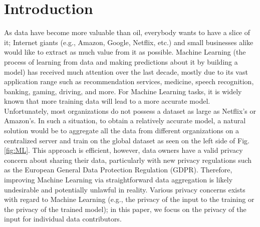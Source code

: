 \documentclass[USenglish,oneside,twocolumn]{article}
\theoremstyle{plain}
\begin{document}
    \vspace{-0.5cm}

	
    \DOI{}
    \received{}
    \revised{}
    \accepted{}

    \journalyear{}
    \journalvolume{}
    \journalissue{}

	\maketitle

    \vspace{-0.5cm}
    \section{Introduction}
    \label{sec:int}
    \vspace{-0.25cm}
    
    As data have become more valuable than oil, everybody wants to have a slice of it; Internet giants (e.g., Amazon, Google, Netflix, etc.) and small businesses alike would like to extract as much value from it as possible. Machine Learning (the process of learning from data and making predictions about it by building a model) has received much attention over the last decade, mostly due to its vast application range such as recommendation services, medicine, speech recognition, banking, gaming, driving, and more. For Machine Learning tasks, it is widely known that more training data will lead to a more accurate model. Unfortunately, most organizations do not possess a dataset as large as Netflix's or Amazon's. In such a situation, to obtain a relatively accurate model, a natural solution would be to aggregate all the data from different organizations on a centralized server and train on the global dataset as seen on the left side of Fig. \ref{fig:ML}. This approach is efficient, however, data owners have a valid privacy concern about sharing their data, particularly with new privacy regulations such as the European General Data Protection Regulation (GDPR). Therefore,  improving Machine Learning via straightforward data aggregation is likely undesirable and potentially unlawful in reality. Various privacy concerns exists with regard to Machine Learning (e.g., the privacy of the input to the training or the privacy of the trained model); in this paper, we focus on the privacy of the input for individual data contributors.
    
\end{document}
